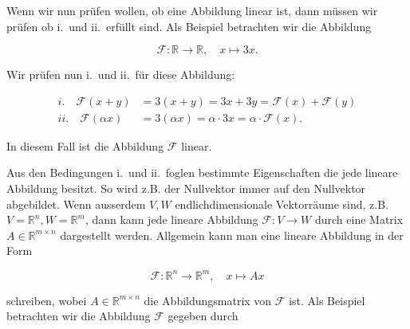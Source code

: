 \vspace{0.5\baselineskip}

Wenn wir nun prüfen wollen, ob eine Abbildung linear ist, dann müssen wir prüfen ob i.\ und ii.\ erfüllt sind. Als Beispiel betrachten wir die Abbildung

\begin{equation*}
    \mathcal{F}: \mathbb{R} \rightarrow \mathbb{R}, \quad x \mapsto 3x. 
\end{equation*}

\vspace{0.5\baselineskip}

Wir prüfen nun i.\ und ii.\ für diese Abbildung:

\begin{equation*}
    \begin{aligned}
        i. \quad \mathcal{F}(x + y) &= 3(x + y) = 3x + 3y = \mathcal{F}(x) + \mathcal{F}(y) \\
        ii. \quad \mathcal{F}(\alpha x) &= 3(\alpha x) = \alpha \cdot 3x = \alpha \cdot \mathcal{F}(x).
    \end{aligned}
\end{equation*}

\vspace{0.5\baselineskip}

In diesem Fall ist die Abbildung \( \mathcal{F} \) linear. 

\vspace{1\baselineskip}

Aus den Bedingungen i.\ und ii.\ foglen bestimmte Eigenschaften die jede lineare Abbildung besitzt. So wird z.B. der Nullvektor immer auf den Nullvektor abgebildet. Wenn ausserdem \( V, W \) endlichdimensionale Vektorräume sind, z.B. \( V = \mathbb{R}^n, W = \mathbb{R}^m \), dann kann jede lineare Abbildung \( \mathcal{F}: V \rightarrow W \)  durch eine Matrix \( A \in \mathbb{R}^{m \times n} \) dargestellt werden. Allgemein kann man eine lineare Abbildung in der Form

\begin{equation*}
    \mathcal{F}: \mathbb{R}^n \rightarrow \mathbb{R}^m, \quad x \mapsto Ax
\end{equation*}

\vspace{0.5\baselineskip}

schreiben, wobei \( A \in \mathbb{R}^{m \times n} \) die Abbildungsmatrix von \( \mathcal{F} \) ist. Als Beispiel betrachten wir die Abbildung \( \mathcal{F} \) gegeben durch

